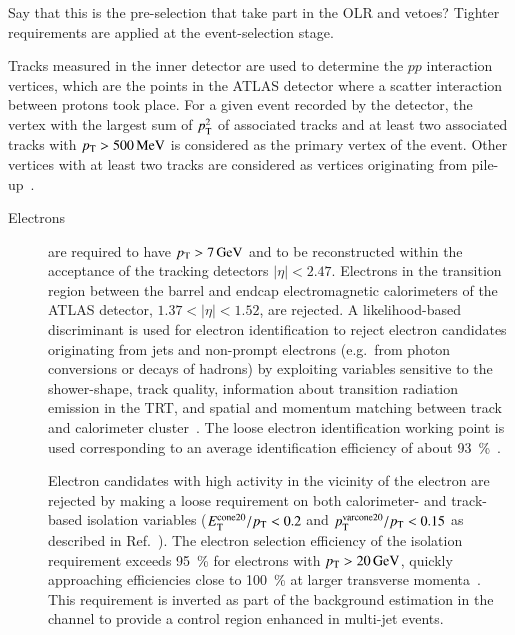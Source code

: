 Say that this is the pre-selection that take part in the OLR and
vetoes? Tighter requirements are applied at the event-selection stage.

Tracks measured in the inner detector are used to determine the $pp$
interaction vertices, which are the points in the ATLAS detector where
a scatter interaction between protons took place. For a given event
recorded by the detector, the vertex with the largest sum of $p_{\text{T}}^2$
of associated tracks and at least two associated tracks with
$p_{\text{T}} > \SI{500}{\ensuremath{\text{MeV}}}$ is considered as the primary vertex of the
event. Other vertices with at least two tracks are considered as
vertices originating from pile-up~\cite{PERF-2015-01}.

\begin{description}

\item[Electrons] are required to have $\pT > \SI{7}{\GeV}$ and to be
  reconstructed within the acceptance of the tracking detectors
  $|\eta| < \num{2.47}$. Electrons in the transition region between
  the barrel and endcap electromagnetic calorimeters of the ATLAS
  detector, $1.37 < |\eta| < 1.52$, are rejected. A likelihood-based
  discriminant is used for electron identification to reject electron
  candidates originating from jets and non-prompt electrons (e.g.\
  from photon conversions or decays of hadrons) by exploiting
  variables sensitive to the shower-shape, track quality, information
  about transition radiation emission in the TRT, and spatial and
  momentum matching between track and calorimeter
  cluster~\cite{EGAM-2018-01}. The loose electron identification
  working point is used corresponding to an average identification
  efficiency of about \SI{93}{\percent}~\cite{EGAM-2018-01}.

  Electron candidates with high activity in the vicinity of the
  electron are rejected by making a loose requirement on both
  calorimeter- and track-based isolation variables
  ($E_{\text{T}}^\text{cone20} / p_{\text{T}} < 0.2$ and
  $p_{\text{T}}^{\text{varcone20}}/ p_{\text{T}} < 0.15$ as described in
  Ref.~\cite{EGAM-2018-01}). The electron selection efficiency of the
  isolation requirement exceeds \SI{95}{\percent} for electrons with
  $\pT > \SI{20}{\GeV}$, quickly approaching efficiencies close to
  \SI{100}{\percent} at larger transverse
  momenta~\cite{EGAM-2018-01}. This requirement is inverted as part of
  the \faketauhadvis background estimation in the \lephad channel to
  provide a control region enhanced in multi-jet events.


\end{description}
